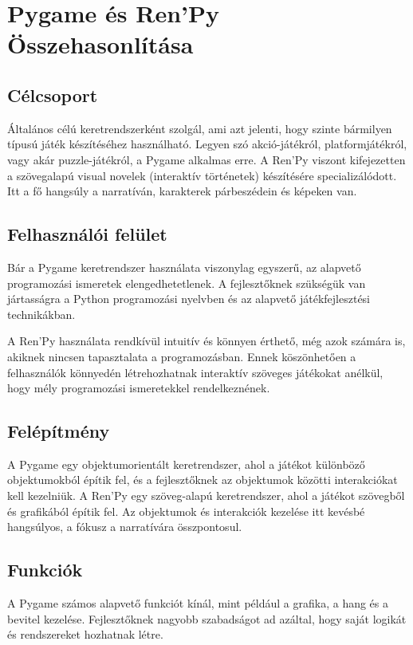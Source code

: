 \section{Pygame és Ren'Py Összehasonlítása}

\subsection{Célcsoport}

Általános célú keretrendszerként szolgál, ami azt jelenti, hogy szinte bármilyen típusú játék készítéséhez használható. Legyen szó akció-játékról, platformjátékról, vagy akár puzzle-játékról, a Pygame alkalmas erre.
A Ren'Py viszont kifejezetten a szövegalapú visual novelek (interaktív történetek) készítésére specializálódott. Itt a fő hangsúly a narratíván, karakterek párbeszédein és képeken van.

\subsection{Felhasználói felület}

Bár a Pygame keretrendszer használata viszonylag egyszerű, az alapvető programozási ismeretek elengedhetetlenek. A fejlesztőknek szükségük van jártasságra a Python programozási nyelvben és az alapvető játékfejlesztési technikákban.

A Ren'Py használata rendkívül intuitív és könnyen érthető, még azok számára is, akiknek nincsen tapasztalata a programozásban. Ennek köszönhetően a felhasználók könnyedén létrehozhatnak interaktív szöveges játékokat anélkül, hogy mély programozási ismeretekkel rendelkeznének.
\subsection{Felépítmény}

A Pygame egy objektumorientált keretrendszer, ahol a játékot különböző objektumokból építik fel, és a fejlesztőknek az objektumok közötti interakciókat kell kezelniük.
A Ren'Py egy szöveg-alapú keretrendszer, ahol a játékot szövegből és grafikából építik fel. Az objektumok és interakciók kezelése itt kevésbé hangsúlyos, a fókusz a narratívára összpontosul.

\subsection{Funkciók}

A Pygame számos alapvető funkciót kínál, mint például a grafika, a hang és a bevitel kezelése. Fejlesztőknek nagyobb szabadságot ad azáltal, hogy saját logikát és rendszereket hozhatnak létre.

